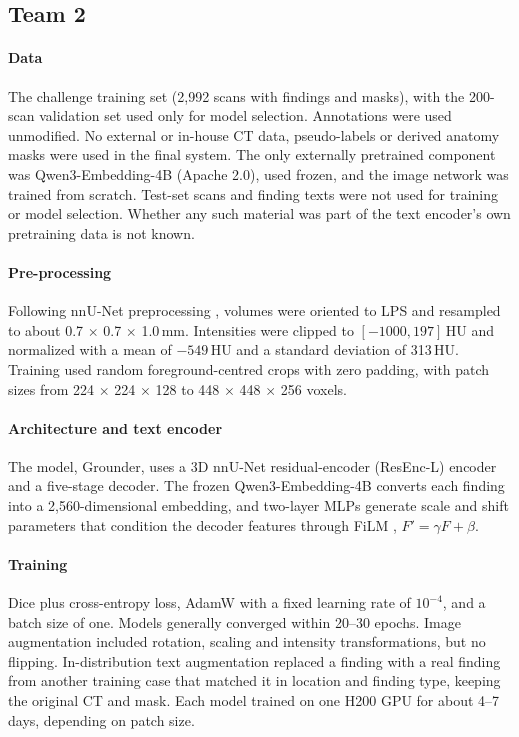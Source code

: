 \subsection{Team 2}
\label{app:team2}

\paragraph{Data} The challenge training set (2,992 scans with findings and
masks), with the 200-scan validation set used only for model selection.
Annotations were used unmodified. No external or in-house CT data, pseudo-labels
or derived anatomy masks were used in the final system. The only externally
pretrained component was Qwen3-Embedding-4B \citep{zhang2025qwen3} (Apache 2.0),
used frozen, and the image network was trained from scratch. Test-set scans and
finding texts were not used for training or model selection. Whether any such
material was part of the text encoder's own pretraining data is not known.

\paragraph{Pre-processing} Following nnU-Net preprocessing \citep{isensee2021nnu},
volumes were oriented to LPS and resampled to about
0.7 $\times$ 0.7 $\times$ 1.0\,mm. Intensities were clipped to
$[-1000, 197]$\,HU and normalized with a mean of $-549$\,HU and a standard
deviation of 313\,HU. Training used random foreground-centred crops with zero
padding, with patch sizes from 224 $\times$ 224 $\times$ 128 to
448 $\times$ 448 $\times$ 256 voxels.

\paragraph{Architecture and text encoder} The model, Grounder, uses a 3D nnU-Net
residual-encoder (ResEnc-L) encoder \citep{isensee2024nnu} and a five-stage
decoder. The frozen Qwen3-Embedding-4B converts each finding into a
2,560-dimensional embedding, and two-layer MLPs generate scale and shift
parameters that condition the decoder features through FiLM
\citep{perez2018film}, $F' = \gamma F + \beta$.

\paragraph{Training} Dice plus cross-entropy loss, AdamW with a fixed learning
rate of $10^{-4}$, and a batch size of one. Models generally converged within
20--30 epochs. Image augmentation included rotation, scaling and intensity
transformations, but no flipping. In-distribution text augmentation replaced a
finding with a real finding from another training case that matched it in
location and finding type, keeping the original CT and mask. Each model trained
on one H200 GPU for about 4--7 days, depending on patch size.

